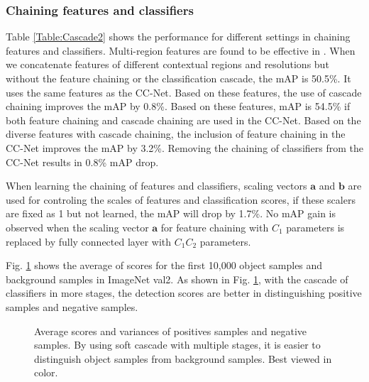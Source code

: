 \documentclass[10pt,twocolumn,letterpaper]{article}
\begin{document}
\subsubsection{Chaining features and classifiers}
Table \ref{Table:Cascade2} shows the performance for different settings in chaining features and classifiers.
Multi-region features are found to  be effective in \cite{gidaris2015object}. When we concatenate features of different contextual regions and resolutions but without the feature chaining or the classification cascade,  the mAP is 50.5\%. It uses the same features as the CC-Net. Based on these features, the use of cascade chaining improves the mAP by 0.8\%. Based on these features, mAP is 54.5\% if both feature chaining and cascade chaining are used in the CC-Net.  Based on the diverse features with cascade chaining, the inclusion of feature chaining in the CC-Net improves the mAP by 3.2\%. Removing the chaining of classifiers from the CC-Net results in 0.8\% mAP drop.



When learning the chaining of features and classifiers, scaling vectors $\mathbf{a}$ and $\mathbf{b}$ are used for controling the scales of features and classification scores, if these scalers are fixed as 1 but not learned, the mAP will drop by 1.7\%. No mAP gain is observed when the scaling vector $\mathbf{a}$ for feature chaining with $C_1$ parameters is replaced by fully connected layer with $C_1 C_2$ parameters.


Fig. \ref{fig:Cascade_scores} shows the average of scores for the first 10,000 object samples and background samples in ImageNet val2. As shown in Fig. \ref{fig:Cascade_scores}, with the cascade of classifiers in more stages, the detection scores are better in distinguishing positive samples and negative samples. 

\begin{figure}
\begin{center}
 \centerline{}
\end{center}
\vspace{-10pt}
   \caption{Average scores and variances of positives samples and negative samples. By using soft cascade with multiple stages, it is easier to distinguish object samples from background samples.  Best viewed in color.}
\label{fig:Cascade_scores}
\end{figure}
\end{document}
